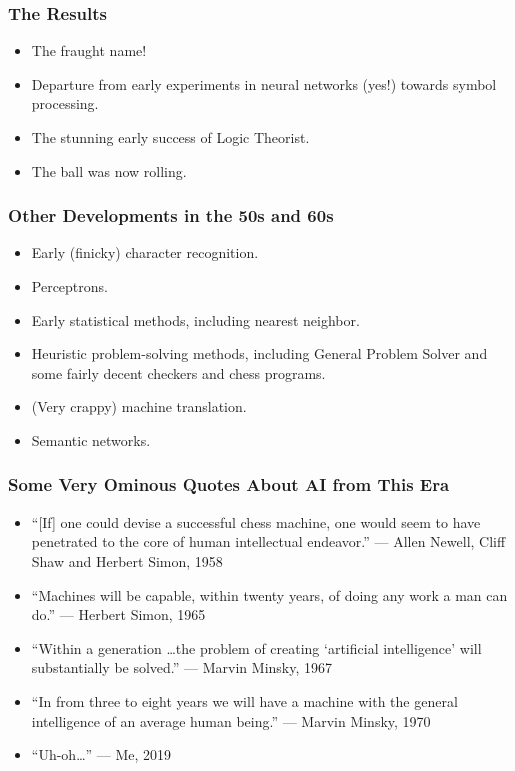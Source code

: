 \documentclass[10pt]{beamer}
\begin{document}
  \begin{frame}
    \frametitle{The Results}
    \begin{itemize}
      \item The fraught name!
      \pause
      \item Departure from early experiments in neural networks (yes!) towards
        symbol processing.
      \pause
      \item The stunning early success of Logic Theorist.
      \pause
      \item The ball was now rolling.
    \end{itemize}
  \end{frame}

  \begin{frame}
    \frametitle{Other Developments in the 50s and 60s}
    \begin{itemize}
      \item Early (finicky) character recognition.
      \pause
      \item Perceptrons.
      \pause
      \item Early statistical methods, including nearest neighbor.
      \pause
      \item Heuristic problem-solving methods, including General Problem
        Solver and some fairly decent checkers and chess programs.
      \pause
      \item (Very crappy) machine translation.
      \pause
      \item Semantic networks.
    \end{itemize}
  \end{frame}

  \begin{frame}
    \frametitle{Some Very Ominous Quotes About AI from This Era}

    \begin{itemize}
      \item ``[If] one could devise a successful chess machine, one would seem
        to have penetrated to the core of human intellectual endeavor.'' ---
        Allen Newell, Cliff Shaw and Herbert Simon, 1958
      \item ``Machines will be capable, within twenty years, of doing any work
        a man can do.'' --- Herbert Simon, 1965
      \item ``Within a generation \ldots the problem of creating `artificial
        intelligence' will substantially be solved.'' --- Marvin Minsky, 1967
      \item ``In from three to eight years we will have a machine with the
        general intelligence of an average human being.'' --- Marvin Minsky,
        1970
      \pause
      \item ``Uh-oh\ldots'' --- Me, 2019
    \end{itemize}
  \end{frame}
\end{document}
